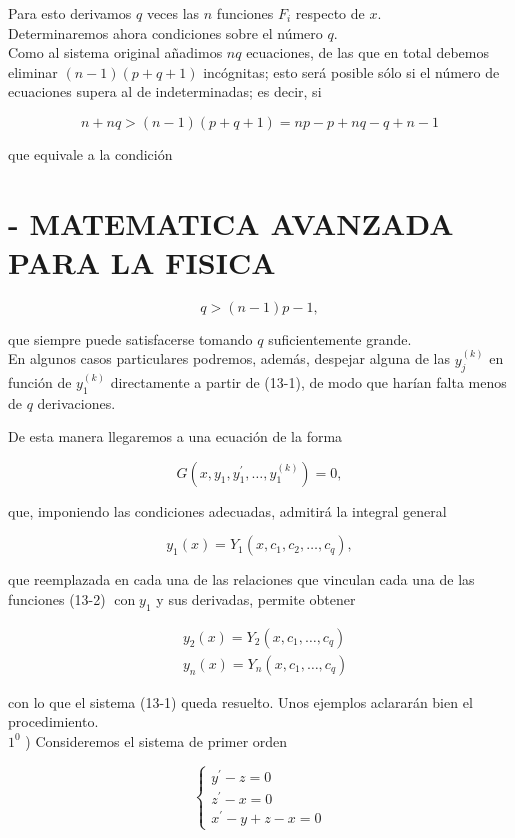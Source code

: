 \documentclass[10pt]{article}
\theoremstyle{plain}
\theoremstyle{definition}
\theoremstyle{remark}
\begin{document}
Para esto derivamos $q$ veces las $n$ funciones $F_{i}$ respecto de $x$.\\
Determinaremos ahora condiciones sobre el número $q$.\\
Como al sistema original añadimos $n q$ ecuaciones, de las que en total debemos eliminar $(n-1)(p+q+1)$ incógnitas; esto será posible sólo si el número de ecuaciones supera al de indeterminadas; es decir, si

$$
n+n q>(n-1)(p+q+1)=n p-p+n q-q+n-1
$$

que equivale a la condición

\section*{- MATEMATICA AVANZADA PARA LA FISICA}
$$
q>(n-1) p-1,
$$

que siempre puede satisfacerse tomando $q$ suficientemente grande.\\
En algunos casos particulares podremos, además, despejar alguna de las $y_{j}^{(k)}$ en función de $y_{1}^{(k)}$ directamente a partir de (13-1), de modo que harían falta menos de $q$ derivaciones.

De esta manera llegaremos a una ecuación de la forma

$$
G\left(x, y_{1}, y_{1}^{\prime}, \ldots, y_{1}^{(k)}\right)=0,
$$

que, imponiendo las condiciones adecuadas, admitirá la integral general

$$
y_{1}(x)=Y_{1}\left(x, c_{1}, c_{2}, \ldots, c_{q}\right),
$$

que reemplazada en cada una de las relaciones que vinculan cada una de las funciones (13-2) $\operatorname{con} y_{1}$ y sus derivadas, permite obtener

$$
\begin{aligned}
& y_{2}(x)=Y_{2}\left(x, c_{1}, \ldots, c_{q}\right) \\
& y_{n}(x)=Y_{n}\left(x, c_{1}, \ldots, c_{q}\right)
\end{aligned}
$$

con lo que el sistema (13-1) queda resuelto. Unos ejemplos aclararán bien el procedimiento.\\
$1^{0}$ ) Consideremos el sistema de primer orden

\[
\left\{\begin{array}{l}
y^{\prime}-z=0  \tag{$13\cdot3$}\\
z^{\prime}-x=0 \\
x^{\prime}-y+z-x=0
\end{array}\right.
\]
\end{document}
